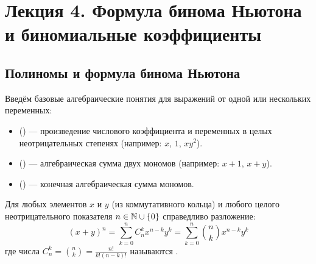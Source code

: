 \section{Лекция 4. Формула бинома Ньютона и биномиальные коэффициенты}

\subsection{Полиномы и формула бинома Ньютона}

\begin{definition}
    Введём базовые алгебраические понятия для выражений от одной или 
    нескольких переменных:
    \begin{itemize}
        \item {} () --- произведение 
        числового коэффициента и переменных в целых неотрицательных 
        степенях (например: $x$, $1$, $x y^2$).
        \item {} () --- алгебраическая сумма 
        двух мономов (например: $x + 1$, $x + y$).
        \item {} () --- конечная 
        алгебраическая сумма мономов.
    \end{itemize}
\end{definition}

\begin{theorem}
    Для любых элементов $x$ и $y$ (из коммутативного кольца) и любого 
    целого неотрицательного показателя $n \in \mathbb{N} \cup \{0\}$ справедливо 
    разложение:
    \begin{equation} \label{eq:newton_binom}
        (x + y)^n = \sum_{k=0}^{n} C_n^k x^{n-k} y^k = 
        \sum_{k=0}^{n} \binom{n}{k} x^{n-k} y^k \tag{1}
    \end{equation}
    где числа $C_n^k = \binom{n}{k} = \frac{n!}{k!(n - k)!}$ называются 
    .
\end{theorem}

